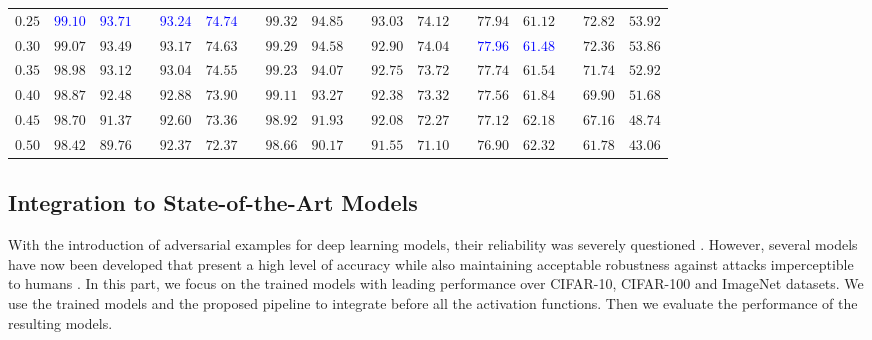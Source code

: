 \documentclass[conference]{IEEEtran}
\begin{document}
\begin{table}[!t]
{\begin{tabular}{cccccccccccccccccc}
    $0.25$ & \textcolor{blue}{$99.10$} & \textcolor{blue}{$93.71$} && \textcolor{blue}{$93.24$} & \textcolor{blue}{$\mathbf{74.74}$} && $99.32$ & $94.85$ && $93.03$ & $\mathbf{74.12}$ && $77.94$& $61.12$&    & $72.82$ & $\mathbf{53.92}$\\
    
    $0.30$ & $99.07$ & $93.49$ && $93.17$ & $74.63$ && $99.29$ & $94.58$ && $92.90$ & $74.04$ && \textcolor{blue}{$77.96$}& \textcolor{blue}{$61.48$}&    & $72.36$ & $53.86$\\
    
    $0.35$ & $98.98$ & $93.12$ && $93.04$ & $74.55$ && $99.23$ & $94.07$ && $92.75$ & $73.72$ && $77.74$& $61.54$&    & $71.74$ & $52.92$\\
    
    $0.40$ & $98.87$ & $92.48$ && $92.88$ & $73.90$ && $99.11$ & $93.27$ && $92.38$ & $73.32$ && $77.56$& $61.84$&    & $69.90$ & $51.68$\\
    
    $0.45$ & $98.70$ & $91.37$ && $92.60$ & $73.36$ && $98.92$ & $91.93$ && $92.08$ & $72.27$ && $77.12$& $62.18$&    & $67.16$ & $48.74$\\
    
    $0.50$ & $98.42$ & $89.76$ && $92.37$ & $72.37$ && $98.66$ & $90.17$ && $91.55$ & $71.10$ && $76.90$& $\mathbf{62.32}$&    & $61.78$ & $43.06$\\
    
    \bottomrule
\end{tabular}
}
\end{table}


\subsection{Integration to State-of-the-Art Models}
With the introduction of adversarial examples for deep learning models, their reliability was severely questioned \cite{tetcw17}. However, several models have now been developed that present a high level of accuracy while also maintaining acceptable robustness against attacks imperceptible to humans \cite{rasca20}. In this part, we focus on the trained models with leading performance over CIFAR-10, CIFAR-100 \cite{lmlk09} and ImageNet \cite{ialdd09} datasets. We use the trained models and the proposed pipeline to integrate \sys before all the activation functions. Then we evaluate the performance of the resulting models.
\end{document}
